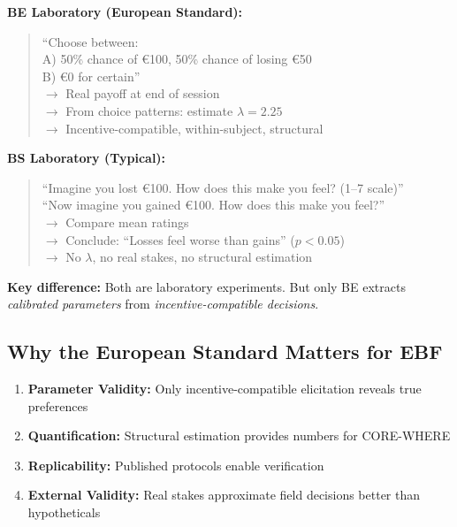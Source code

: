 \documentclass[11pt, a4paper]{article}
\begin{document}
\begin{tcolorbox}[colback=yellow!5!white, colframe=yellow!75!black,
    title=Same Phenomenon, Different Laboratory Approaches]

\textbf{BE Laboratory (European Standard):}
\begin{quote}
``Choose between:\\
A) 50\% chance of €100, 50\% chance of losing €50\\
B) €0 for certain''\\
$\to$ Real payoff at end of session\\
$\to$ From choice patterns: estimate $\lambda = 2.25$\\
$\to$ Incentive-compatible, within-subject, structural
\end{quote}

\textbf{BS Laboratory (Typical):}
\begin{quote}
``Imagine you lost €100. How does this make you feel? (1--7 scale)''\\
``Now imagine you gained €100. How does this make you feel?''\\
$\to$ Compare mean ratings\\
$\to$ Conclude: ``Losses feel worse than gains'' ($p < 0.05$)\\
$\to$ No $\lambda$, no real stakes, no structural estimation
\end{quote}

\textbf{Key difference:} Both are laboratory experiments. But only BE extracts \textit{calibrated parameters} from \textit{incentive-compatible decisions}.

\end{tcolorbox}

\subsection{Why the European Standard Matters for EBF}

\begin{enumerate}
\item \textbf{Parameter Validity:} Only incentive-compatible elicitation reveals true preferences
\item \textbf{Quantification:} Structural estimation provides numbers for CORE-WHERE
\item \textbf{Replicability:} Published protocols enable verification
\item \textbf{External Validity:} Real stakes approximate field decisions better than hypotheticals
\end{enumerate}
\end{document}
